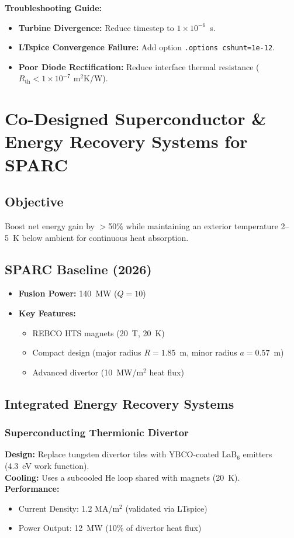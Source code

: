 \documentclass[12pt]{article}
\begin{document}
\textbf{Troubleshooting Guide:}
\begin{itemize}
    \item \textbf{Turbine Divergence:} Reduce timestep to $1\times10^{-6}$~s.
    \item \textbf{LTspice Convergence Failure:} Add option \texttt{.options cshunt=1e-12}.
    \item \textbf{Poor Diode Rectification:} Reduce interface thermal resistance ($R_{\text{th}} < 1\times10^{-7}$ m$^2$K/W).
\end{itemize}

\section{Co-Designed Superconductor \& Energy Recovery Systems for SPARC}
\subsection{Objective}
Boost net energy gain by $>$50\% while maintaining an exterior temperature 2--5~K below ambient for continuous heat absorption.

\subsection{SPARC Baseline (2026)}
\begin{itemize}
    \item \textbf{Fusion Power:} 140~MW ($Q=10$)
    \item \textbf{Key Features:}
    \begin{itemize}
        \item REBCO HTS magnets (20~T, 20~K)
        \item Compact design (major radius $R = 1.85$~m, minor radius $a = 0.57$~m)
        \item Advanced divertor (10~MW/m$^2$ heat flux)
    \end{itemize}
\end{itemize}

\subsection{Integrated Energy Recovery Systems}
\subsubsection{Superconducting Thermionic Divertor}
\textbf{Design:} Replace tungsten divertor tiles with YBCO-coated LaB$_6$ emitters (4.3~eV work function). \\
\textbf{Cooling:} Uses a subcooled He loop shared with magnets (20~K). \\
\textbf{Performance:}
\begin{itemize}
    \item Current Density: 1.2 MA/m$^2$ (validated via LTspice)
    \item Power Output: 12~MW (10\% of divertor heat flux)
\end{itemize}
\end{document}
